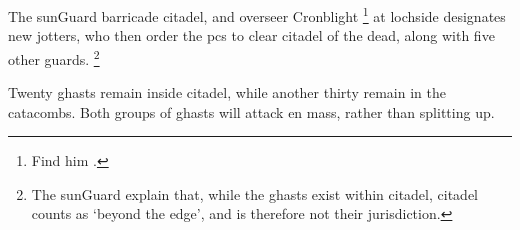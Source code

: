 The \gls{sunGuard} barricade \gls{citadel}, and \gls{overseer} Cronblight%
\footnote{Find him .}
at \gls{lochside} designates new \glspl{jotter}, who then order the \glspl{pc} to clear \gls{citadel} of the dead, along with five other \glspl{guard}.%
\footnote{The \gls{sunGuard} explain that, while the \glspl{ghast} exist within \gls{citadel}, \gls{citadel} counts as `beyond the \gls{edge}', and is therefore not their jurisdiction.}

Twenty \glspl{ghast} remain inside \gls{citadel}, while another thirty remain in the catacombs.
Both groups of \glspl{ghast} will attack en mass, rather than splitting up.

